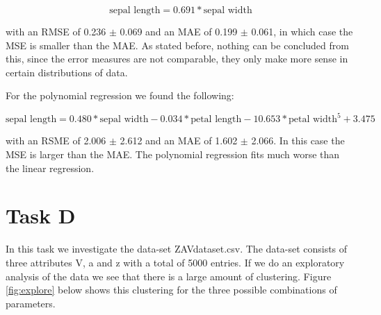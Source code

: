 \documentclass[a4]{article}
\begin{document}
\begin{equation*}
  \text{sepal length} = 0.691*\text{sepal width}
\end{equation*}

with an RMSE of 0.236 $\pm$ 0.069 and an MAE of 0.199 $\pm$ 0.061, in which case the MSE is smaller than the MAE. As stated before, nothing can be concluded from this, since the error measures are not comparable, they only make more sense in certain distributions of data.

For the polynomial regression we found the following:

\begin{equation*}
  \text{sepal length} = 0.480*\text{sepal width} - 0.034*\text{petal length} - 10.653*\text{petal width}^5 + 3.475
\end{equation*}

with an RSME of 2.006 $\pm$ 2.612 and an MAE of 1.602 $\pm$ 2.066. In this case the MSE is larger than the MAE. The polynomial regression fits much worse than the linear regression. 

\section{Task D}
In this task we investigate the data-set ZAVdataset.csv. The data-set consists of three attributes V, a and z with a total of 5000 entries. If we do an exploratory analysis of the data we see that there is a large amount of clustering. Figure \ref{fig:explore} below shows this clustering for the three possible combinations of parameters. 
\end{document}
